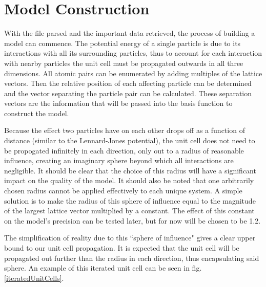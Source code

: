 \section{Model Construction}\label{Sect:procedureConstruction}
\par With the file parsed and the important data retrieved, the process of building a model can commence. The potential energy of a single particle is due to its interactions with all its surrounding particles, thus to account for each interaction with nearby particles the unit cell must be propagated outwards in all three dimensions. All atomic pairs can be enumerated by adding multiples of the lattice vectors. Then the relative position of each affecting particle can be determined and the vector separating the particle pair can be calculated. These separation vectors are the information that will be passed into the basis function to construct the model. 
\par Because the effect two particles have on each other drops off as a function of distance (similar to the Lennard-Jones potential), the unit cell does not need to be propogated infinitely in each direction, only out to a radius of reasonable influence, creating an imaginary sphere beyond which all interactions are negligible. It should be clear that the choice of this radius will have a significant impact on the quality of the model. It should also be noted that one arbitrarily chosen radius cannot be applied effectively to each unique system. A simple solution is to make the radius of this sphere of influence equal to the magnitude of the largest lattice vector multiplied by a constant. The effect of this constant on the model's precision can be tested later, but for now will be chosen to be 1.2.
\par The simplification of reality due to this ``sphere of influence" gives a clear upper bound to our unit cell propagation. It is expected that the unit cell will be propagated out further than the radius in each direction, thus encapsulating said sphere. An example of this iterated unit cell can be seen in fig. \ref{iteratedUnitCells}. 

